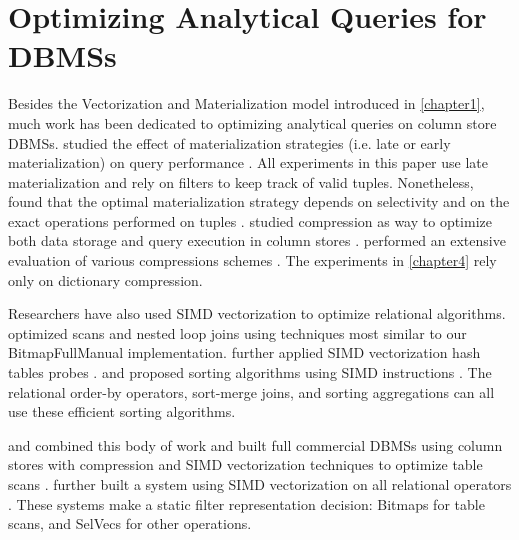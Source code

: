 \documentclass[12pt]{cmuthesis}
\begin{document}
\section{Optimizing Analytical Queries for DBMSs}
Besides the Vectorization and Materialization model introduced in \cref{chapter1}, much work has been dedicated to optimizing analytical queries on column store DBMSs. \citeauthor{materializationstrats} studied the effect of materialization strategies (i.e. late or early materialization) on query performance \cite{materializationstrats}. All experiments in this paper use late materialization and rely on filters to keep track of valid tuples. Nonetheless, \citeauthor{materializationstrats} found that the optimal materialization strategy depends on selectivity and on the exact operations performed on tuples \cite{materializationstrats}. \citeauthor{cstore} studied compression as way to optimize both data storage and query execution in column stores \cite{cstore}. \citeauthor{abadicompression} performed an extensive evaluation of various compressions schemes \cite{abadicompression}. The experiments in \cref{chapter4} rely only on dictionary compression.

Researchers have also used SIMD vectorization to optimize relational algorithms. \citeauthor{simd1} optimized scans and nested loop joins using techniques most similar to our BitmapFullManual implementation. \citeauthor{simd2} further applied SIMD vectorization hash tables probes \cite{simd2}. \citeauthor{simdsort1} and \citeauthor{simdsort2} proposed sorting algorithms using SIMD instructions \cite{simdsort1,simdsort2}. The relational order-by operators, sort-merge joins, and sorting aggregations can all use these efficient sorting algorithms.

\citeauthor{ibm_blu} and \citeauthor{simdscan} combined this body of work and built full commercial DBMSs using column stores with compression and SIMD vectorization techniques to optimize table scans \cite{ibm_blu,simdscan}. \citeauthor{orestis_bitmap} further built a system using SIMD vectorization on all relational operators \cite{orestis_bitmap}. These systems make a static filter representation decision: Bitmaps for table scans, and SelVecs for other operations.
\end{document}
